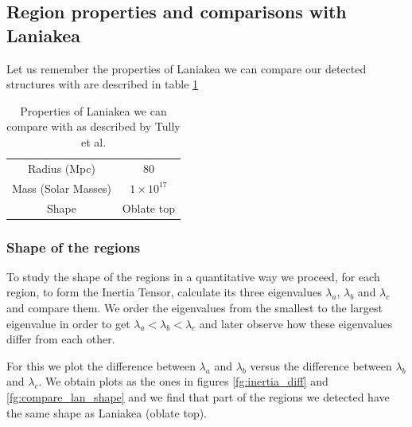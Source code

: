 \documentclass[12pt]{article}
\begin{document}
\subsection{Region properties and comparisons with Laniakea}

\begin{par}
 Let us remember the properties of Laniakea we can compare our detected structures with are described in table \ref{tab:laniakea}
\end{par}
\begin{table}[ht]
    \centering
    \begin{tabular}{|c|c|}
        Radius (Mpc) & 80  \\
        Mass (Solar Masses) & $1 \times 10^{17}$  \\
        Shape & Oblate top
    \end{tabular}
    \caption{Properties of Laniakea we can compare with as described by Tully et al. \cite{tully_laniakea_2014}}
    \label{tab:laniakea}
\end{table}
\FloatBarrier

\subsubsection{Shape of the regions}

\begin{par}
To study the shape of the regions in a quantitative way we
 proceed, for each region, to form the Inertia Tensor,
  calculate its three eigenvalues $\lambda_a$, $\lambda_b$
   and $\lambda_c$ and compare them. We order the eigenvalues
    from the smallest to the
    largest eigenvalue in order to get $\lambda_a < \lambda_b
     < \lambda_c$ and later observe how these eigenvalues
   differ from each other. \\
\end{par}

\begin{par}
For this we plot the difference between $\lambda_a$ and 
 $\lambda_b$ versus the difference between $\lambda_b$ and 
  $\lambda_c$. We obtain plots as the ones in figures
   \ref{fg:inertia_diff} and \ref{fg:compare_lan_shape} and
    we find that part of the regions we detected have the
     same shape as Laniakea (oblate top).
\end{par}
\end{document}
